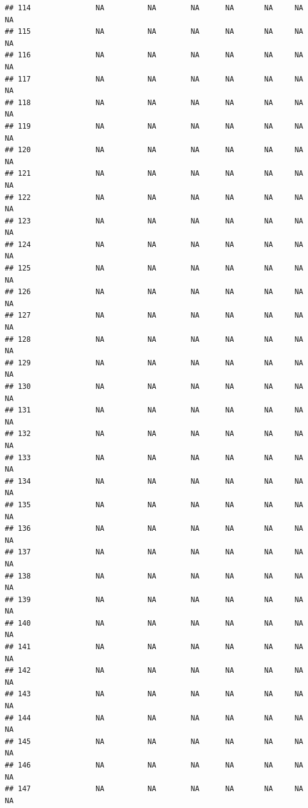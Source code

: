 \documentclass[
]{article}
\begin{document}
\begin{verbatim}
## 114               NA          NA        NA      NA       NA     NA     NA
## 115               NA          NA        NA      NA       NA     NA     NA
## 116               NA          NA        NA      NA       NA     NA     NA
## 117               NA          NA        NA      NA       NA     NA     NA
## 118               NA          NA        NA      NA       NA     NA     NA
## 119               NA          NA        NA      NA       NA     NA     NA
## 120               NA          NA        NA      NA       NA     NA     NA
## 121               NA          NA        NA      NA       NA     NA     NA
## 122               NA          NA        NA      NA       NA     NA     NA
## 123               NA          NA        NA      NA       NA     NA     NA
## 124               NA          NA        NA      NA       NA     NA     NA
## 125               NA          NA        NA      NA       NA     NA     NA
## 126               NA          NA        NA      NA       NA     NA     NA
## 127               NA          NA        NA      NA       NA     NA     NA
## 128               NA          NA        NA      NA       NA     NA     NA
## 129               NA          NA        NA      NA       NA     NA     NA
## 130               NA          NA        NA      NA       NA     NA     NA
## 131               NA          NA        NA      NA       NA     NA     NA
## 132               NA          NA        NA      NA       NA     NA     NA
## 133               NA          NA        NA      NA       NA     NA     NA
## 134               NA          NA        NA      NA       NA     NA     NA
## 135               NA          NA        NA      NA       NA     NA     NA
## 136               NA          NA        NA      NA       NA     NA     NA
## 137               NA          NA        NA      NA       NA     NA     NA
## 138               NA          NA        NA      NA       NA     NA     NA
## 139               NA          NA        NA      NA       NA     NA     NA
## 140               NA          NA        NA      NA       NA     NA     NA
## 141               NA          NA        NA      NA       NA     NA     NA
## 142               NA          NA        NA      NA       NA     NA     NA
## 143               NA          NA        NA      NA       NA     NA     NA
## 144               NA          NA        NA      NA       NA     NA     NA
## 145               NA          NA        NA      NA       NA     NA     NA
## 146               NA          NA        NA      NA       NA     NA     NA
## 147               NA          NA        NA      NA       NA     NA     NA

\end{verbatim}
\end{document}
